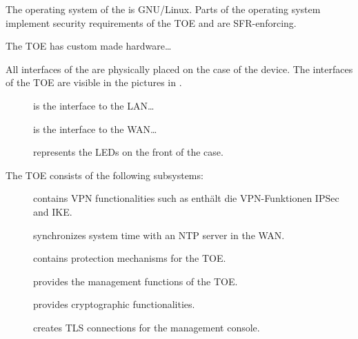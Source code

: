 

The operating system of the \thisproduct{} is GNU/Linux. Parts of the operating
system implement security requirements of the TOE and are SFR-enforcing.



The TOE has custom made hardware\dots{}



All interfaces of the \thisproduct{} are physically placed on the case of the
device. The interfaces of the TOE are visible in the pictures in
.

\begin{description}
\item[] is the interface to the LAN\dots
\item[] is the interface to the WAN\dots
\item[] represents the LEDs on the front of the case.
\end{description}



\clearpage


The TOE consists of the following subsystems:

\begin{description}
\item[] contains VPN functionalities such as enthält die
  VPN-Funktionen IPSec and IKE.
\item[] synchronizes system time with an NTP server in the WAN.
\item[] contains protection mechanisms for the TOE.
\item[] provides the management functions of the TOE.
\item[] provides cryptographic functionalities.
\item[] creates TLS connections for the management console.
\end{description}

